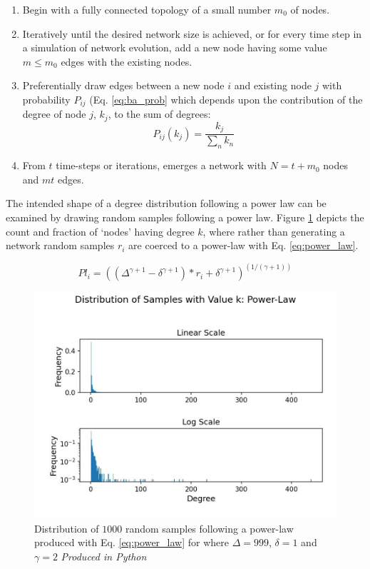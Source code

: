 \documentclass[
	a4paper, %
	10pt, %
	unnumberedsections, %
	twoside, %
]{LTJournalArticle}
\begin{document}
	\begin{enumerate}
		\item Begin with a fully connected topology of a small number \(m_0\) of nodes.
		\item Iteratively until the desired network size is achieved, or for every time step in a simulation of network evolution, add a new node having some value \(m \leq m_{0}\) edges with the existing nodes.
		\item Preferentially draw edges between a new node \(i\) and existing node \(j\) with probability \(P_{ij}\) (Eq. \ref{eq:ba_prob} which depends upon the contribution of the degree of node \(j\), \(k_{j}\), to the sum of degrees:
		\begin{equation*}
			P_{ij}(k_{j}) = \frac{k_{j}}{\sum_{n}k_{n}}
			\label{eq:ba_prob}
		\end{equation*}
		\item From \(t\) time-steps or iterations, emerges a network with \(N = t + m_{0}\) nodes and \(mt\) edges. 
	\end{enumerate}
	
The intended shape of a degree distribution following a power law can be examined by drawing random samples following a power law. Figure \ref{fig:powerlaw_log} depicts the count and fraction of `nodes' having degree \(k\), where rather than generating a network random samples \(r_{i}\) are coerced to a power-law with Eq. \ref{eq:power_law}.

\begin{equation}
	Pl_{i} = ((\Delta^{\gamma + 1} -  \delta^{\gamma + 1}) * r_{i} + \delta^{\gamma + 1})^{(1 / (\gamma + 1))}
	\label{eq:power_law}
\end{equation}

\begin{figure} %
	\includegraphics[width=\linewidth]{Figures/ba/power_law_dist.jpg}
	\caption{Distribution of \(1000\) random samples following a power-law produced with Eq. \ref{eq:power_law} for where \(\Delta = 999\), \(\delta = 1\) and \(\gamma = 2\) \emph{Produced in Python}}
	\label{fig:powerlaw_log}
\end{figure}
\end{document}
